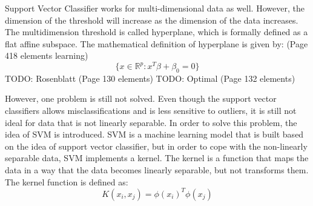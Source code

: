 Support Vector Classifier works for multi-dimensional data as well. However, the dimension of the threshold will increase as
the dimension of the data increases. The multidimension threshold is called hyperplane, which is formally defined as a flat
affine subspace. The mathematical definition of hyperplane is given by: (Page 418 elements learning)
\begin{equation}
    \{x \in \mathbb{R}^p: x^T \beta + \beta_0 = 0\}
\end{equation}
TODO: Rosenblatt (Page 130 elements)
TODO: Optimal (Page 132 elements)

However, one problem is still not solved. Even though the support vector classifiers allows misclassifications and is less
sensitive to outliers, it is still not ideal for data that is not linearly separable. In order to solve this problem, the
idea of SVM is introduced. SVM is a machine learning model that is built based on the idea of support vector classifier,
but in order to cope with the non-linearly separable data, SVM implements a kernel. The kernel is a function that maps
the data in a way that the data becomes linearly separable, but not transforms them. The kernel function is defined as:
\begin{equation}
    K(x_i, x_j) = \phi(x_i)^T \phi(x_j)
\end{equation}
